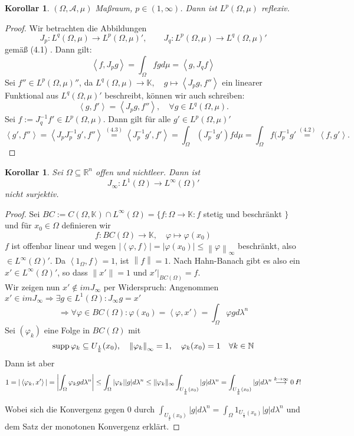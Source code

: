\documentclass[ngerman]{report}
\theoremstyle{plain}%
\newtheorem{cor}[thm]{Korollar}
\theoremstyle{definition}%
\theoremstyle{myStyle}
\newcommand{\R}{\mathbb{R}}
\newcommand{\N}{\mathbb{N}}
\newcommand{\K}{\mathbb{K}}
\newcommand{\supp}{\textnormal{supp}}
\newcommand{\norm}[1]{\left \|#1\right\| }
\newcommand{\df}[1][]{%
	\overset{#1}{\Rightarrow}
}
\newcommand{\abs}[1]{\left\lvert #1 \right\rvert }
\newcommand{\lightning}{\text{\Lightning}}
\newcommand{\fop}[1]{\left \langle #1 \right \rangle} %
\begin{document}
	\begin{cor}
		$(\Omega, \mathcal{A}, \mu)$ Maßraum, $p\in (1,\infty)$. Dann ist $L^p (\Omega, \mu)$ reflexiv.
	\end{cor}
	\begin{proof}
		Wir betrachten die Abbildungen 
		$$J_p : L^q(\Omega,\mu) \to L^p(\Omega,\mu)',\qquad J_q:L^p(\Omega,\mu)\to L^q(\Omega,\mu)'$$	
		gemäß (4.1) . Dann gilt:
		\begin{equation}
			\fop{f,J_p g} = \int_\Omega fgd\mu  = \fop{g,J_q f}
		\end{equation}
		Sei $f'' \in L^p(\Omega,\mu)''$, da $L^q(\Omega,\mu) \to \K,\quad g \mapsto \fop{J_pg, f''}$ ein linearer Funktional aus $L^q(\Omega,\mu)'$ beschreibt, können wir auch schreiben:
		\begin{equation}
		\fop{g,f'} = \fop{J_p g, f''},\quad \forall g\in L^q(\Omega, \mu)		.	
		\end{equation}
		Sei $f:= J^{-1}_q f' \in L^p(\Omega,\mu).$ Dann gilt für alle $g'\in L^p(\Omega,\mu)'$
		$$\fop{g',f''} = \fop{J_p { J^{-1}_p g'} , f''} \overset{(4.3)}{ = } \fop{J^{-1}_p g',f'} = \int_\Omega (J^{-1}_p g') f d \mu = \int_\Omega f (J_p^{-1} g' \overset{(4.2)}{=} \fop{f,g'}.$$
	\end{proof}		
	\begin{cor}
		Sei $\Omega \subseteq \R^n$ offen und nichtleer. Dann ist
			$$J_\infty : L^1(\Omega) \to L^\infty(\Omega)'$$
			nicht surjektiv.
	\end{cor}
	\begin{proof}
		Sei $BC:= C(\Omega,\K) \cap L^\infty(\Omega) = \{f:\Omega \to \K : f$ stetig und beschränkt $\}$ und für
		$x_0 \in \Omega$ definieren wir
		$$f: BC(\Omega) \to \K,\quad \varphi \mapsto \varphi(x_0)$$
		$f$ ist offenbar linear und  wegen $|\fop{\varphi, f}| = |\varphi (x_0)| \leq \norm{\varphi}_\infty$
		beschränkt, also $\in L^\infty(\Omega)'$. Da $\fop{1_\Omega,f} = 1$, ist $\norm{f} = 1$. Nach Hahn-Banach gibt es also ein $x' \in L^\infty(\Omega)'$, so dass $\|x'\| = 1$ und $x'|_{BC(\Omega)} = f$.\\
		Wir zeigen nun $x' \not\in im J_\infty$ per Widerspruch: Angenommen $x' \in im J_\infty \df \exists g \in L^1(\Omega) : J_\infty g = x'$
		$$\df \forall \varphi\in BC(\Omega) : \varphi(x_0) = \fop{\varphi, x'} = \int_\Omega \varphi g d\lambda^n$$
		Sei $(\varphi_k)$ eine Folge in $BC(\Omega)$ mit 
		$$\supp\, \varphi_k \subseteq U_{\frac{1}{k}}(x_0),\quad \norm{\varphi_k}_\infty = 1,\quad \varphi_k(x_0) = 1\quad \forall k\in\N$$
		Dann ist aber
		$$1 = |\fop{\varphi_k, x'}| = \abs{\int_\Omega \varphi_k g d\lambda^n}\leq \int_\Omega |\varphi_k||g| d\lambda^n \leq \| \varphi_k \|_\infty \int_{U_{\frac{1}{k}}(x_0)}|g|d \lambda^n = \int_{U_{\frac{1}{k}}(x_0)}|g|d \lambda^n \overset{k\to\infty}{\longrightarrow} 0 \;\lightning!$$
		
		Wobei sich die Konvergenz gegen $0$ durch $\int_{U_{\frac{1}{k}}(x_0)}|g|d \lambda^n = \int_\Omega 1_{U_{\frac{1}{k}}(x_0)} |g| d\lambda^n$ und dem Satz der monotonen Konvergenz erklärt. 
	\end{proof}
\end{document}
